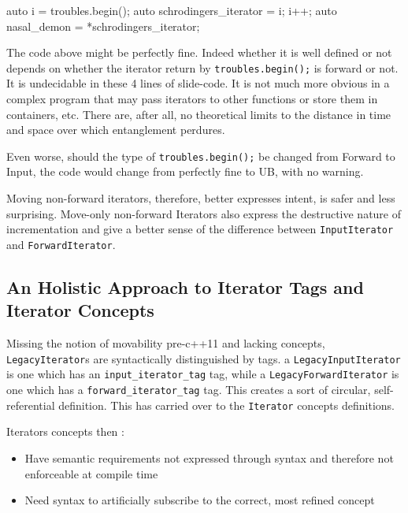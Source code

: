 \documentclass{wg21}
\begin{document}
\begin{codeblock}
	auto i = troubles.begin();
	auto schrodingers_iterator = i;
	i++;
	auto nasal_demon = *schrodingers_iterator;
\end{codeblock}

The code above might be perfectly fine. Indeed whether it is well
defined or not depends on whether the iterator return by
\texttt{troubles.begin();} is forward or not. It is undecidable in these
4 lines of slide-code. It is not much more obvious in a complex program
that may pass iterators to other functions or store them in containers,
etc. There are, after all, no theoretical limits to the distance in time
and space over which entanglement perdures.

Even worse, should the type of \texttt{troubles.begin();} be changed
from Forward to Input, the code would change from perfectly fine to UB,
with no warning.

Moving non-forward iterators, therefore, better expresses intent, is
safer and less surprising. Move-only non-forward Iterators also express
the destructive nature of incrementation and give a better sense of the
difference between \texttt{InputIterator} and \texttt{ForwardIterator}.

\hypertarget{an-holistic-approach-to-iterator-tags-and-iterator-concepts}{%
	\subsection{An Holistic Approach to Iterator Tags and Iterator
		Concepts}\label{an-holistic-approach-to-iterator-tags-and-iterator-concepts}}

Missing the notion of movability pre-c++11 and lacking concepts,
\texttt{LegacyIterator}s are syntactically distinguished by tags. a
\texttt{LegacyInputIterator} is one which has an
\texttt{input\_iterator\_tag} tag, while a
\texttt{LegacyForwardIterator} is one which has a
\texttt{forward\_iterator\_tag} tag. This creates a sort of circular,
self-referential definition. This has carried over to the \texttt{Iterator} concepts definitions. 

Iterators concepts then :

\begin{itemize}
	\item Have semantic requirements not expressed through syntax and therefore not enforceable at compile time
	\item Need syntax to artificially subscribe to the correct, most refined concept
\end{itemize}
\end{document}
